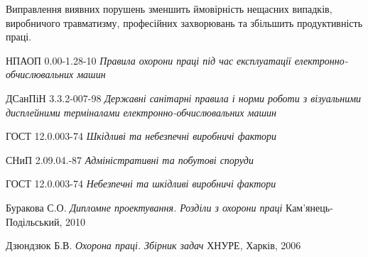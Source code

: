 \documentclass[a4paper,12pt]{article}
\begin{document}
Виправлення виявних порушень зменшить ймовірність нещасних випадків, виробничого травматизму, професійних захворювань та збільшить продуктивність праці.


\begin{thebibliography}{9}
	НПАОП 0.00-1.28-10
	\emph{Правила охорони праці під час експлуатації електронно-обчислювальних машин}
	
	ДСанПіН  3.3.2-007-98
	\emph{Державні санітарні правила і норми роботи з візуальними дисплейними терміналами електронно-обчислювальних машин}
	
	ГОСТ 12.0.003-74
	\emph{Шкідливі та небезпечні виробничі фактори}
	
	СНиП 2.09.04.-87
	\emph{Адміністративні та побутові споруди}
	
	ГОСТ 12.0.003-74
	\emph{Небезпечні та шкідливі виробничі фактори}
	
	Буракова С.О.
	\emph{Дипломне проектування. Розділи з охорони праці}
	Кам’янець-Подільський, 2010
	
	Дзюндзюк Б.В.
	\emph{Охорона праці. Збірник задач}
	ХНУРЕ, Харків, 2006

\end{thebibliography}
\end{document}
